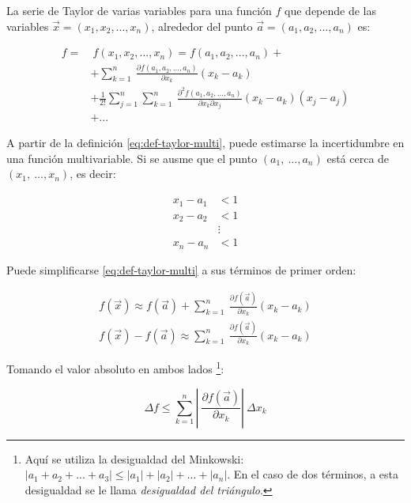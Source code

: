 \begin{definition}

    La serie de Taylor de varias variables para una función $f$ que depende
    de las variables $\vec{x} = (x_1, x_2, ..., x_n)$, alrededor del
    punto $ \vec{a} = (a_1, a_2, ..., a_n)$ es:

    \begin{align*}
        f = & \ f(x_1, x_2, ..., x_n) = f(a_1, a_2, ..., a_n) + \\ 
            & + \sum_{k=1}^{n} \
            \frac{\partial f(a_1,a_2,...,a_n)}{\partial x_k}(x_k-a_k)\\
            & + \frac{1}{2!} \sum_{j=1}^{n} \sum_{k=1}^{n} \
            \frac{\partial^2 f(a_1,a_2,...,a_n)}{\partial x_k \partial
            x_j}(x_k-a_k)(x_j-a_j)\\
            & + ...
    \end{align*}
    \label{eq:def-taylor-multi}

\end{definition}

A partir de la definición \ref{eq:def-taylor-multi}, puede estimarse la
incertidumbre en una función multivariable. Si se ausme que el punto $(a_1,\
\dots, a_n)$ está cerca de $(x_1,\ \dots, x_n)$, es decir:

\begin{align*}
    x_1 - a_1 &< 1 \\
    x_2 - a_2 &< 1 \\
              &\vdots \\
    x_n - a_n &< 1
\end{align*}

Puede simplificarse \ref{eq:def-taylor-multi} a sus términos de primer orden:

\begin{align*}
    f(\vec{x}) \approx f(\vec{a}) + \sum_{k=1}^{n} \
    \frac{\partial f(\vec{a})}{\partial x_k} (x_k - a_k) \\
    f(\vec{x}) - f(\vec{a}) \approx \sum_{k=1}^{n} \
    \frac{\partial f(\vec{a})}{\partial x_k} (x_k - a_k)
\end{align*}

Tomando el valor absoluto en ambos lados \footnote{Aquí se utiliza la
    desigualdad del Minkowski: $|a_1 + a_2 + ... + a_3| \leq |a_1| + |a_2| + ... +
    |a_n|$. En el caso de dos términos, a esta desigualdad se le llama
\textit{desigualdad del triángulo}.}:

\begin{equation} \label{eq:desigualdad-tri-taylor}
    \Delta f \leq \sum_{k=1}^{n} \left |\ 
    \frac{\partial f(\vec{a})}{\partial x_k} \right| \
    \Delta x_k
\end{equation}

